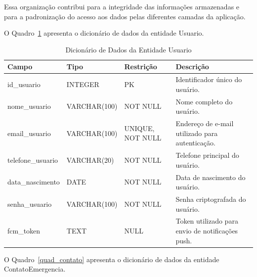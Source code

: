 Essa organização contribui para a integridade das informações armazenadas e para a padronização do acesso aos dados pelas diferentes camadas da aplicação.


O Quadro~\ref{quad_usuario} apresenta o dicionário de dados da entidade Usuario.

\begin{table}[H]
\caption{Dicionário de Dados da Entidade Usuario}
\label{quad_usuario}
\centering
\footnotesize

\begin{tabular}{|p{3cm}|p{2.5cm}|p{4cm}|p{5cm}|}
\hline
\textbf{Campo} & \textbf{Tipo} & \textbf{Restrição} & \textbf{Descrição} \\
\hline

id\_usuario & INTEGER & PK & Identificador único do usuário. \\
\hline

nome\_usuario & VARCHAR(100) & NOT NULL & Nome completo do usuário. \\
\hline

email\_usuario & VARCHAR(100) & UNIQUE, NOT NULL & Endereço de e-mail utilizado para autenticação. \\
\hline

telefone\_usuario & VARCHAR(20) & NOT NULL & Telefone principal do usuário. \\
\hline

data\_nascimento & DATE & NOT NULL & Data de nascimento do usuário. \\
\hline

senha\_usuario & VARCHAR(100) & NOT NULL & Senha criptografada do usuário. \\
\hline

fcm\_token & TEXT & NULL & Token utilizado para envio de notificações push. \\
\hline

\end{tabular}

\normalsize

\end{table}

O Quadro~\ref{quad_contato} apresenta o dicionário de dados da entidade ContatoEmergencia.

